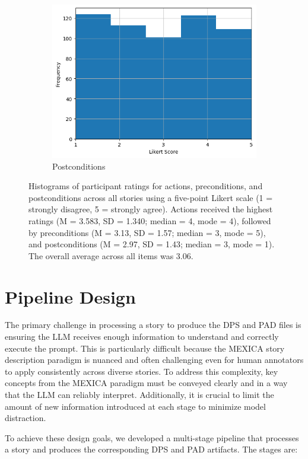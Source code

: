 \documentclass[phd,electronic,oneside,twosidetoc,letterpaper,chaptercenter,parttop,lof]{byumsphd}
\begin{document}
\begin{figure}[t!]
\begin{subfigure}[b]{0.32\textwidth}
    \includegraphics[width=\textwidth]{images/llmexica/story_postcondition_likert_scores.png}
    \caption{Postconditions}
    \label{fig:postconditions}
  \end{subfigure}
  \caption[Survey histograms]{Histograms of participant ratings for actions, preconditions, and postconditions across all stories using a five-point Likert scale (1 = strongly disagree, 5 = strongly agree). Actions received the highest ratings (M = 3.583, SD = 1.340; median = 4, mode = 4), followed by preconditions (M = 3.13, SD = 1.57; median = 3, mode = 5), and postconditions (M = 2.97, SD = 1.43; median = 3, mode = 1). The overall average across all items was 3.06.}
  \label{fig:survey_hist}
\end{figure}


\section{Pipeline Design}
The primary challenge in processing a story to produce the DPS and PAD files is ensuring the LLM receives enough information to understand and correctly execute the prompt. This is particularly difficult because the MEXICA story description paradigm is nuanced and often challenging even for human annotators to apply consistently across diverse stories. To address this complexity, key concepts from the MEXICA paradigm must be conveyed clearly and in a way that the LLM can reliably interpret. Additionally, it is crucial to limit the amount of new information introduced at each stage to minimize model distraction.

To achieve these design goals, we developed a multi-stage pipeline that processes a story and produces the corresponding DPS and PAD artifacts. The stages are:
\end{document}
